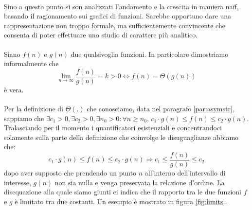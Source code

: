 \documentclass[11pt,a4paper,oneside]{article}
\begin{document}
\paragraph*{}Sino a questo punto si son analizzati l'andamento e la crescita in maniera naïf, basando il ragionamento sui grafici di funzioni. Sarebbe opportuno dare una rappresentazione non troppo formale, ma sufficientemente convincente che consenta di poter effettuare uno studio di carattere più analitico. 
\paragraph*{} Siano $f(n)$ e $g(n)$ due qualsivoglia funzioni. In particolare dimostriamo informalmente che 
\begin{equation}
\lim_{n\to \infty} \frac{f(n)}{g(n)} = k > 0 \Leftrightarrow f(n) = \Theta(g(n))
\label{eq:equiv}
\end{equation}
è vera.
\paragraph*{} Per la definizione di $\Theta(.)$ che conosciamo, data nel paragrafo \ref{par:asymstr}, sappiamo che $\exists c_1>0, \exists c_2 > 0, \exists n_0 > 0 : \forall n \geq n_0,\,c_1\cdot g(n) \leq f(n) \leq c_2\cdot g(n)$. Tralasciando per il momento i quantificatori esistenziali e concentrandoci solamente sulla parte della definizione che coinvolge le disuguaglianze abbiamo che: 
\begin{equation}
c_1 \cdot g(n) \leq f(n) \leq c_2\cdot g(n) \Rightarrow c_1 \leq \frac{f(n)}{g(n)} \leq c_2 \label{eq:eq1}
\end{equation} dopo aver supposto che prendendo un punto $n$ all'interno dell'intervallo di interesse, $g(n)$ non sia nulla e venga preservata la relazione d'ordine. La disequazione alla quale siamo giunti ci indica che il rapporto tra le due funzioni $f$ e $g$ è limitato tra due costanti. Un esempio è mostrato in figura \ref{fig:limits}.
\end{document}

